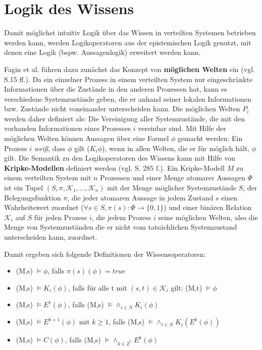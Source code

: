 \section{Logik des Wissens}
\label{Logik}
Damit möglichst intuitiv Logik über das Wissen in verteilten Systemen betrieben werden kann, werden Logikoperatoren aus der epistemischen Logik genutzt, mit denen eine Logik (bspw. Aussagenlogik) erweitert werden kann.

Fagin et al. führen dazu zunächst das Konzept von \textbf{möglichen Welten} ein (vgl. \cite{fagin2003reasoning} S.15 ff.). 
Da ein einzelner Prozess in einem verteilten System nur eingeschränkte Informationen über die Zustände in den anderen Prozessen hat, kann es verschiedene Systemzustände geben, die er anhand seiner lokalen Informationen bzw. Zustände nicht voneinander unterscheiden kann. Die möglichen Welten $P_i$ werden daher definiert als: Die Vereinigung aller Systemzustände, die mit den vorhanden Informationen eines Prozesses $i$ vereinbar sind.
Mit Hilfe der möglichen Welten können Aussagen über eine Formel $\phi$ gemacht werden:
Ein Prozess $i$ \textit{weiß}, dass $\phi$ gilt ($K_i\phi$), wenn in allen Welten, die er für möglich hält, $\phi$ gilt.
Die Semantik zu den Logikoperatoren des Wissens kann mit Hilfe von \textbf{Kripke-Modellen} definiert werden (vgl. \cite{kshemkalyani2011distributed} S. 285 f.).
Ein Kripke-Modell $M$ zu einem verteilten System mit $n$ Prozessen und einer Menge atomarer Aussagen $\Phi$ ist ein Tupel $(S,\pi,\mathcal{K}_1,...,\mathcal{K}_n)$ mit der Menge möglicher Systemzustände $S$, der Belegungsfunktion $\pi$, die jeder atomaren Aussage in jedem Zustand $s$ einen Wahrheitswert zuordnet ($\forall s\in S, \pi(s):\Phi \rightarrow \{0,1\}$) und einer binären Relation $\mathcal{K}_i$ auf $S$ für jeden Prozess $i$, die jedem Prozess $i$ seine möglichen Welten, also die Menge von Systemzuständen die er nicht vom tatsächlichen Systemzustand unterscheiden kann, zuordnet.\medskip

Damit ergeben sich folgende Definitionen der Wissensoperatoren:
\begin{itemize}
\item (M,s) $\vDash \phi$, falls $\pi(s)(\phi) = true$
\item (M,s) $\vDash K_i(\phi)$, falls für alle t mit $(s,t) \in \mathcal{K}_i $ gilt: (M,t) $\vDash \phi$
\item (M,s) $\vDash E^1(\phi)$, falls (M,s) $\vDash\land_{i\in N}K_i(\phi)$
\item (M,s) $\vDash E^{k+1}(\phi)$ mit $k\ge 1$, falls (M,s) $\vDash\land_{i\in N}K_i(E^k(\phi))$
\item (M,s) $\vDash C(\phi)$, falls (M,s) $\vDash\land_{k\in Z^*}E^k(\phi)$
\end{itemize}

